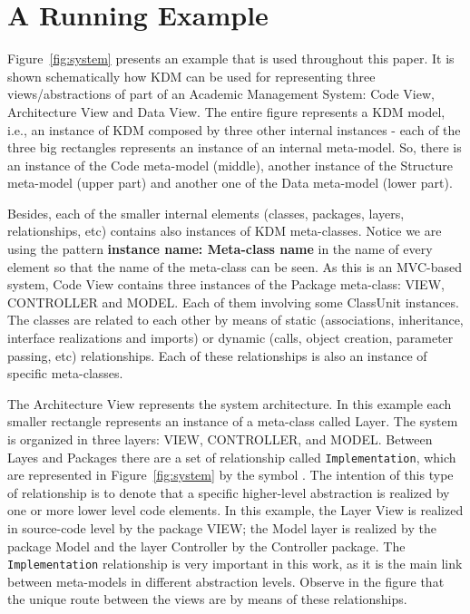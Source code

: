 \section{A Running Example}\label{sec:running_example}

Figure~\ref{fig:system} presents an example that is used throughout this paper. It is shown schematically how KDM can be used for representing three views/abstractions of part of an Academic Management System: Code View, Architecture View and Data View. The entire figure represents a KDM model, i.e., an instance of KDM composed by three other internal instances - each of the three big rectangles represents an instance of an internal meta-model. So, there is an instance of the Code meta-model (middle), another instance of the Structure meta-model (upper part) and another one of the Data meta-model (lower part). 

Besides, each of the smaller internal elements (classes, packages, layers, relationships, etc) contains also instances of KDM meta-classes. Notice we are using the pattern \textbf{instance name: Meta-class name} in the name of every element so that the name of the meta-class can be seen. As this is an MVC-based system, Code View contains three instances of the Package meta-class: VIEW, CONTROLLER and MODEL. Each of them involving some ClassUnit instances. The classes are related to each other by means of static (associations, inheritance, interface realizations and imports) or dynamic (calls, object creation, parameter passing, etc) relationships. Each of these relationships is also an instance of specific meta-classes. 

The Architecture View represents the system architecture. In this example each smaller rectangle represents an instance of a meta-class called Layer. The system is organized in three layers:  VIEW, CONTROLLER, and MODEL. Between Layes and Packages there are a set of relationship called \texttt{Implementation}, which are represented in Figure~\ref{fig:system} by the symbol \foobarMeu. The intention of this type of relationship is to denote that a specific higher-level abstraction is realized by one or more lower level code elements. In this example, the Layer View is realized in source-code level by the package VIEW; the Model layer is realized by the package Model and the layer Controller by the Controller package. The \texttt{Implementation} relationship is very important in this work, as it is the main link between meta-models in different abstraction levels. Observe in the figure that the unique route between the views are by means of these relationships.

